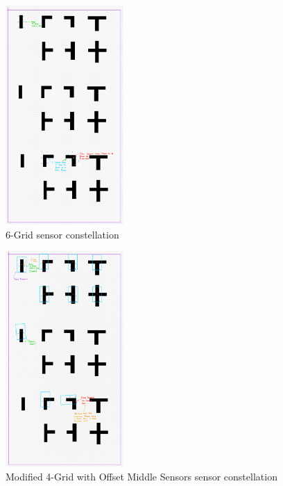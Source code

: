 \documentclass[conference]{IEEEtran}
\begin{document}
\begin{figure}[htbp]
	\centerline{\includegraphics[width=0.4\textwidth]{constellation-6-grid.png}}
	\caption{6-Grid sensor constellation}
	\label{fig:constellation-6-grid}
\end{figure}
\begin{figure}[htbp]
	\centerline{\includegraphics[width=0.4\textwidth]{constellation-4-offset.png}}
	\caption{Modified 4-Grid with Offset Middle Sensors sensor constellation}
	\label{fig:constellation-4-offset}
\end{figure}
\end{document}
